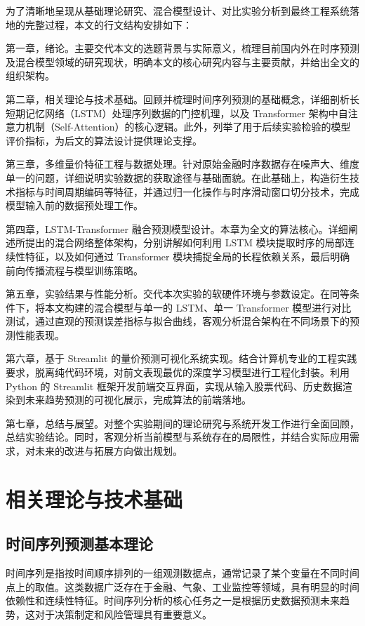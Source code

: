 \documentclass[UTF8,AutoFakeBold=1,AutoFakeSlant,zihao=-4]{SCAU}
\begin{document}
为了清晰地呈现从基础理论研究、混合模型设计、对比实验分析到最终工程系统落地的完整过程，本文的行文结构安排如下：

第一章，绪论。主要交代本文的选题背景与实际意义，梳理目前国内外在时序预测及混合模型领域的研究现状，明确本文的核心研究内容与主要贡献，并给出全文的组织架构。

第二章，相关理论与技术基础。回顾并梳理时间序列预测的基础概念，详细剖析长短期记忆网络（LSTM）处理序列数据的门控机理，以及 Transformer 架构中自注意力机制（Self-Attention）的核心逻辑。此外，列举了用于后续实验检验的模型评价指标，为后文的算法设计提供理论支撑。

第三章，多维量价特征工程与数据处理。针对原始金融时序数据存在噪声大、维度单一的问题，详细说明实验数据的获取途径与基础面貌。在此基础上，构造衍生技术指标与时间周期编码等特征，并通过归一化操作与时序滑动窗口切分技术，完成模型输入前的数据预处理工作。

第四章，LSTM-Transformer 融合预测模型设计。本章为全文的算法核心。详细阐述所提出的混合网络整体架构，分别讲解如何利用 LSTM 模块提取时序的局部连续性特征，以及如何通过 Transformer 模块捕捉全局的长程依赖关系，最后明确前向传播流程与模型训练策略。

第五章，实验结果与性能分析。交代本次实验的软硬件环境与参数设定。在同等条件下，将本文构建的混合模型与单一的 LSTM、单一 Transformer 模型进行对比测试，通过直观的预测误差指标与拟合曲线，客观分析混合架构在不同场景下的预测性能表现。

第六章，基于 Streamlit 的量价预测可视化系统实现。结合计算机专业的工程实践要求，脱离纯代码环境，对前文表现最优的深度学习模型进行工程化封装。利用 Python 的 Streamlit 框架开发前端交互界面，实现从输入股票代码、历史数据渲染到未来趋势预测的可视化展示，完成算法的前端落地。

第七章，总结与展望。对整个实验期间的理论研究与系统开发工作进行全面回顾，总结实验结论。同时，客观分析当前模型与系统存在的局限性，并结合实际应用需求，对未来的改进与拓展方向做出规划。

\section{相关理论与技术基础}
\subsection{时间序列预测基本理论}

时间序列是指按时间顺序排列的一组观测数据点，通常记录了某个变量在不同时间点上的取值。这类数据广泛存在于金融、气象、工业监控等领域，具有明显的时间依赖性和连续性特征。时间序列分析的核心任务之一是根据历史数据预测未来趋势，这对于决策制定和风险管理具有重要意义。
\end{document}
